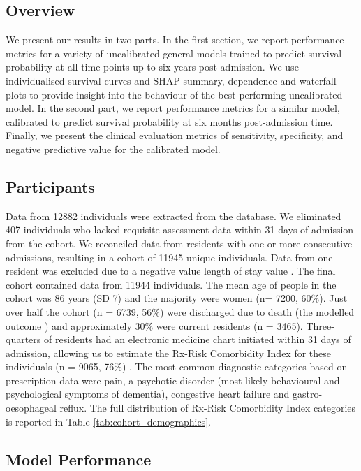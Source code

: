\documentclass{article}
\begin{document}
\subsection{Overview}
We present our results in two parts. In the first section, we report performance metrics for a variety of uncalibrated general models trained to predict survival probability at all time points up to six years post-admission. We use individualised survival curves and SHAP summary, dependence and waterfall plots to provide  insight into the behaviour of the best-performing uncalibrated model. In the second part, we report performance metrics for a similar model, calibrated to predict survival probability at six months post-admission time.  Finally, we present the clinical evaluation metrics of sensitivity, specificity, and negative predictive value for the calibrated model.

\subsection{Participants}
Data from 12882 individuals were extracted from the database. We eliminated 407 individuals who lacked requisite assessment data within 31 days of admission from the cohort.  We reconciled data from residents with one or more consecutive admissions, resulting in a cohort of 11945 unique individuals. Data from one resident was excluded due to a negative value length of stay value . The final cohort contained data from 11944 individuals.   The mean age of people in the cohort was 86 years (SD 7) and the majority were women (n= 7200, 60\%).  Just over half the cohort (n = 6739, 56\%) were discharged due to death (the modelled outcome ) and approximately 30\% were current residents (n = 3465).  Three-quarters of residents had an electronic medicine chart initiated within 31 days of admission, allowing us to estimate the Rx-Risk Comorbidity Index for these individuals (n = 9065, 76\%) \cite{pratt2018validity}.  The most common diagnostic categories based on prescription data were pain, a psychotic disorder (most likely behavioural and psychological symptoms of dementia), congestive heart failure and gastro-oesophageal reflux.  The full distribution of Rx-Risk Comorbidity Index categories is reported in Table \ref{tab:cohort_demographics}.





\subsection{Model Performance}
\end{document}
